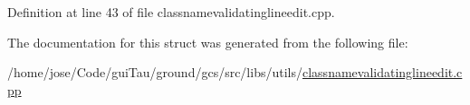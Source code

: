 Definition at line 43 of file classnamevalidatinglineedit.\-cpp.



The documentation for this struct was generated from the following file\-:\begin{DoxyCompactItemize}
\item 
/home/jose/\-Code/gui\-Tau/ground/gcs/src/libs/utils/\hyperlink{classnamevalidatinglineedit_8cpp}{classnamevalidatinglineedit.\-cpp}\end{DoxyCompactItemize}
